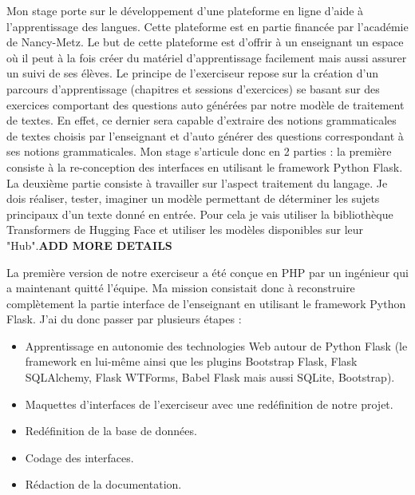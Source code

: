 \documentclass[12pt]{article}
\begin{document}
Mon stage porte sur le développement d’une plateforme en ligne d’aide à l’apprentissage des langues. Cette plateforme est en partie financée par l’académie de Nancy-Metz. Le but de cette plateforme est d’offrir à un enseignant un espace où il peut à la fois créer du matériel d'apprentissage facilement mais aussi assurer un suivi de ses élèves. Le principe de l'exerciseur repose sur la création d'un parcours d'apprentissage (chapitres et sessions d'exercices) se basant sur des exercices comportant des questions auto générées par notre modèle de traitement de textes. En effet, ce dernier sera capable d'extraire des notions grammaticales de textes choisis par l'enseignant et d'auto générer des questions correspondant à ses notions grammaticales. 
Mon stage s’articule donc en 2 parties : la première consiste à la re-conception des interfaces en utilisant le framework Python Flask. La deuxième partie consiste à travailler sur l’aspect traitement du langage. Je dois réaliser, tester, imaginer un modèle permettant de déterminer les sujets principaux d'un texte donné en entrée. Pour cela je vais utiliser la bibliothèque Transformers de Hugging Face et utiliser les modèles disponibles sur leur "Hub".\textbf{ADD MORE DETAILS} 

La première version de notre exerciseur a été conçue en PHP par un ingénieur qui a maintenant quitté l’équipe. Ma mission consistait donc à reconstruire complètement la partie interface de l’enseignant en utilisant le framework Python Flask. J’ai du donc passer par plusieurs étapes : 

\begin{itemize}


    \item Apprentissage en autonomie des technologies Web autour de Python Flask (le framework en lui-même ainsi que les plugins Bootstrap Flask, Flask SQLAlchemy, Flask WTForms, Babel Flask mais aussi SQLite, Bootstrap).
    
    \item Maquettes d'interfaces de l’exerciseur avec une redéfinition de notre projet.
    
    \item Redéfinition de la base de données. 
    
    \item Codage des interfaces.
    
    \item Rédaction de la documentation.
    
\end{itemize}
\end{document}
